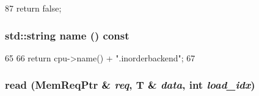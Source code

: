 \begin{DoxyCode}
87 { return false; }
\end{DoxyCode}
\hypertarget{classInorderBackEnd_a37627d5d5bba7f4a8690c71c2ab3cb07}{
\subsubsection[{name}]{\setlength{\rightskip}{0pt plus 5cm}std::string name () const}}
\label{classInorderBackEnd_a37627d5d5bba7f4a8690c71c2ab3cb07}



\begin{DoxyCode}
65 {
66     return cpu->name() + ".inorderbackend";
67 }
\end{DoxyCode}
\hypertarget{classInorderBackEnd_ad2981b6704bca036af0723daaaebe57e}{
\subsubsection[{read}]{ read (MemReqPtr \& {\em req}, \/  T \& {\em data}, \/  int {\em load\_\-idx})}}
\label{classInorderBackEnd_ad2981b6704bca036af0723daaaebe57e}



